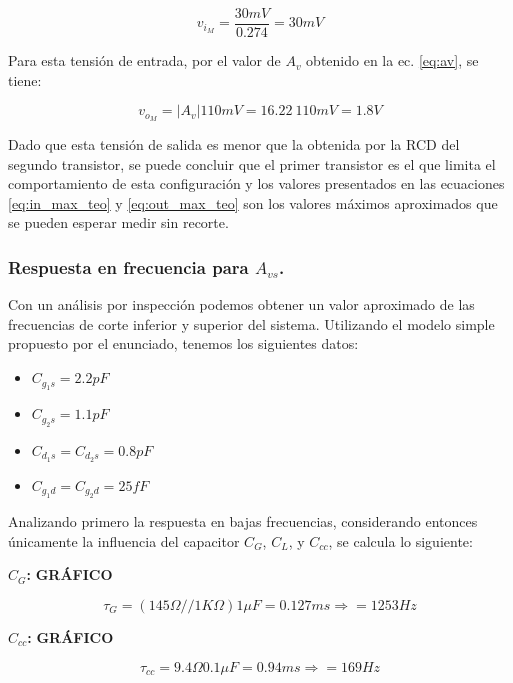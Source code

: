 \documentclass[a4paper, 10pt, spanish]{article}
\begin{document}
\begin{equation}
  v_{i_M}=\frac{30mV}{0.274}=30mV
  \label{eq:in_max_teo}
\end{equation}

Para esta tensión de entrada, por el valor de $A_v$ obtenido en la ec. \ref{eq:av}, se tiene:

\begin{equation}
  v_{o_M}=|A_v|110mV=16.22\ 110mV = 1.8V
  \label{eq:out_max_teo}
\end{equation}

Dado que esta tensión de salida es menor que la obtenida por la RCD del segundo transistor, se puede concluir que el primer transistor es el que limita el comportamiento de esta configuración y los valores presentados en las ecuaciones \ref{eq:in_max_teo} y \ref{eq:out_max_teo} son los valores máximos aproximados que se pueden esperar medir sin recorte.


\subsubsection{Respuesta en frecuencia para $A_{vs}$.}
Con un análisis por inspección podemos obtener un valor aproximado de las frecuencias de corte inferior y superior del sistema. Utilizando el modelo simple propuesto por el enunciado, tenemos los siguientes datos:
\begin{itemize}
  \item $C_{g_1s} = 2.2pF$
  \item $C_{g_2s} = 1.1pF$
  \item $C_{d_1s} = C_{d_2s} = 0.8pF$
  \item $C_{g_1d} = C_{g_2d} = 25fF$
\end{itemize}

Analizando primero la respuesta en bajas frecuencias, considerando entonces únicamente la influencia del capacitor $C_G$, $C_L$, y $C_{cc}$, se calcula lo siguiente:

\textbf{$C_G$:}
\textbf{GRÁFICO}

\begin{equation}
  \tau_G = (145\Omega//1K\Omega) 1\mu F = 0.127ms \Rightarrow = 1253 Hz
\end{equation}

\textbf{$C_{cc}$:}
\textbf{GRÁFICO}

\begin{equation}
  \tau_{cc} = 9.4\Omega 0.1\mu F = 0.94ms \Rightarrow = 169 Hz
\end{equation}
\end{document}
